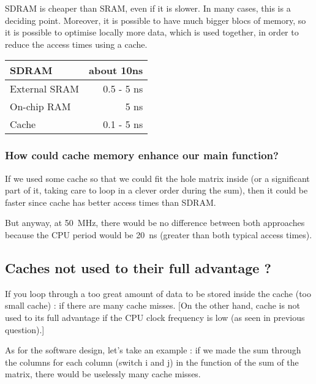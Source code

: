 \documentclass[a4paper,10pt]{article}
\begin{document}
SDRAM is cheaper than SRAM, even if it is slower. In many cases, this is a deciding point. Moreover, it is possible to have much bigger blocs of memory, so it is possible to optimise locally more data, which is used together, in order to reduce the access times using a cache. 


\begin{tabular}{|l|r|}
   \hline
   SDRAM & about 10ns \\
   \hline
   External SRAM & 0.5 - 5 ns\\
   \hline
   On-chip RAM & 5 ns\\
   \hline
   Cache & 0.1 - 5 ns\\
   \hline
\end{tabular}

\subsubsection{How could cache memory enhance our main function?}

If we used some cache so that we could fit the hole matrix inside (or a significant part of it, taking care to loop in a clever order during the sum), then it could be faster since cache has better access times than SDRAM. 

But anyway, at 50~MHz, there would be no difference between both approaches because the CPU period would be 20~ns (greater than both typical access times).

\subsection{Caches not used to their full advantage ?}

If you loop through a too great amount of data to be stored inside the cache (too small cache) : if there are many cache misses. [On the other hand, cache is not used to its full advantage if the CPU clock frequency is low (as seen in previous question).]

As for the software design, let's take an example : if we made the sum through the columns for each column (switch i and j) in the function of the sum of the matrix, there would be uselessly many cache misses.
\end{document}
